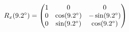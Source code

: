 \documentclass[preview]{standalone}
\begin{document}
\begin{align*}
\special{dvisvgm:raw <g id='unique000'>}R_x(9.2^\circ) = \begin{pmatrix} 1 & 0 & 0 \\ 0 & \cos(9.2^\circ) & -\sin(9.2^\circ) \\ 0 & \sin(9.2^\circ) & \cos(9.2^\circ) \end{pmatrix}\special{dvisvgm:raw </g>}
\end{align*}
\end{document}
